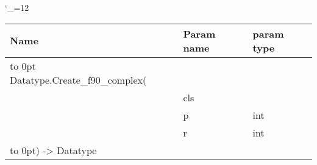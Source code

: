 \begingroup \catcode`\_=12 \tt
\begin{tabular}{lll}
\toprule
\textrm{Name}&\textrm{Param name}&\textrm{param type}\\
\midrule
\hbox to 0pt {Datatype.Create_f90_complex(\hss}\\
& cls\\
& p & int\\
& r & int\\
\hbox to 0pt{) -> Datatype\hss}\\
\bottomrule
\end{tabular}
\endgroup
